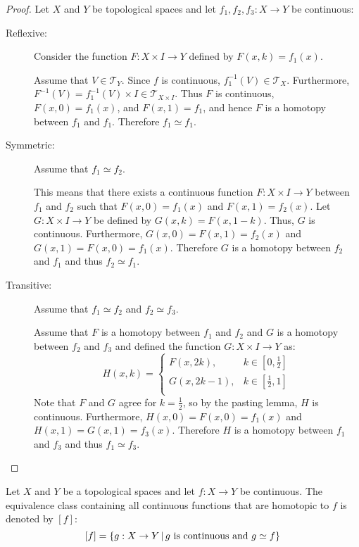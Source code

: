 \documentclass[letterpaper,12pt,fleqn]{article}
\newcommand{\T}{\mathscr{T}}
\begin{document}
\begin{proof}
  Let \(X\) and \(Y\) be topological spaces and let \(f_1,f_2,f_3:X\to Y\) be continuous:
  \begin{description}
  \item[Reflexive:] Consider the function \(F:X\times I\to Y\) defined by \(F(x,k)=f_1(x)\).

    Assume that \(V\in\T_Y\).  Since \(f\) is continuous, \(f_1^{-1}(V)\in\T_X\).  Furthermore,
    \(F^{-1}(V)=f_1^{-1}(V)\times I\in\T_{X\times I}\).  Thus \(F\) is continuous, \(F(x,0)=f_1(x)\), and
    \(F(x,1)=f_1\), and hence \(F\) is a homotopy between \(f_1\) and \(f_1\).  Therefore \(f_1\simeq f_1\).

  \item[Symmetric:]  Assume that \(f_1\simeq f_2\).

    This means that there exists a continuous function \(F:X\times I\to Y\) between \(f_1\) and \(f_2\) such that
    \(F(x,0)=f_1(x)\) and \(F(x,1)=f_2(x)\).  Let \(G:X\times I\to Y\) be defined by \(G(x,k)=F(x,1-k)\).  Thus,
    \(G\) is continuous.  Furthermore, \(G(x,0)=F(x,1)=f_2(x)\) and \(G(x,1)=F(x,0)=f_1(x)\).  Therefore \(G\) is a
    homotopy between \(f_2\) and \(f_1\) and thus \(f_2\simeq f_1\).

  \item[Transitive:]  Assume that \(f_1\simeq f_2\) and \(f_2\simeq f_3\).

    Assume that \(F\) is a homotopy between \(f_1\) and \(f_2\) and \(G\) is a homotopy between \(f_2\) and \(f_3\)
    and defined the function \(G:X\times I\to Y\) as:
    \[H(x,k)=\begin{cases}
    F(x,2k), & k\in\left[0,\frac{1}{2}\right] \\
    G(x,2k-1), & k\in\left[\frac{1}{2},1\right] \\
    \end{cases}\]
    Note that \(F\) and \(G\) agree for \(k=\frac{1}{2}\), so by the pasting lemma, \(H\) is continuous.
    Furthermore, \(H(x,0)=F(x,0)=f_1(x)\) and \(H(x,1)=G(x,1)=f_3(x)\).  Therefore \(H\) is a homotopy between
    \(f_1\) and \(f_3\) and thus \(f_1\simeq f_3\).
  \end{description}
\end{proof}

\begin{notation}
  Let \(X\) and \(Y\) be a topological spaces and let \(f:X\to Y\) be continuous.  The equivalence class containing
  all continuous functions that are homotopic to \(f\) is denoted by \([f]\):
  \[[f]=\left\{{g:X\to Y}\,\middle|\,{g\ \text{is continuous and}\ g\simeq f}\right\}\]
\end{notation}
\end{document}
